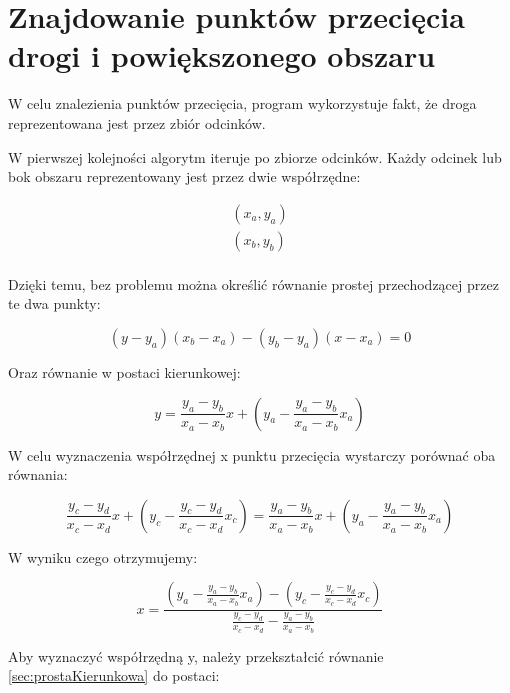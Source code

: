 \newpage
\section{Znajdowanie punktów przecięcia drogi i powiększonego obszaru}
\label{sec:ZnajdowaniePunktówPrzecięciaDrogiIPowiększonegoObszaru}
W celu znalezienia punktów przecięcia, program wykorzystuje fakt, że droga reprezentowana jest przez zbiór odcinków.

W pierwszej kolejności algorytm iteruje po zbiorze odcinków. Każdy odcinek lub bok obszaru reprezentowany jest przez dwie współrzędne:

\begin{equation}
\begin{split}
(x_a, y_a) \\
(x_b, y_b) \\
\end{split}
\end{equation}

Dzięki temu, bez problemu można określić równanie prostej przechodzącej przez te dwa punkty:

\begin{equation}
(y - y_a) (x_b-x_a) - (y_b - y_a) (x - x_a) = 0
\end{equation}

Oraz równanie w postaci kierunkowej:

\begin{equation} \label{sec:prostaKierunkowa}
y=\frac{y_a - y_b}{x_a - x_b}x + (y_a - \frac{y_a - y_b}{x_a - x_b}x_a)
\end{equation}

W celu wyznaczenia współrzędnej x punktu przecięcia wystarczy porównać oba równania:

\begin{equation}
\frac{y_c - y_d}{x_c - x_d}x + (y_c - \frac{y_c - y_d}{x_c - x_d}x_c)=\frac{y_a - y_b}{x_a - x_b}x + (y_a - \frac{y_a - y_b}{x_a - x_b}x_a)
\end{equation}

W wyniku czego otrzymujemy:

\begin{equation}
x = \frac{(y_a - \frac{y_a - y_b}{x_a - x_b}x_a) - (y_c - \frac{y_c - y_d}{x_c - x_d}x_c)}{\frac{y_c - y_d}{x_c - x_d} - \frac{y_a - y_b}{x_a - x_b}}
\end{equation}

Aby wyznaczyć współrzędną y, należy przekształcić równanie \ref{sec:prostaKierunkowa} do postaci:

